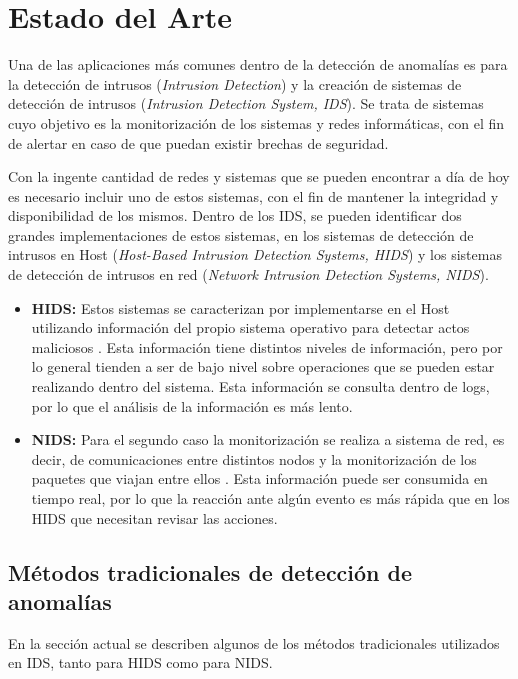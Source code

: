 \chapter{Estado del Arte}
\label{chapter:Estado del Arte}

Una de las aplicaciones más comunes dentro de la detección de anomalías es para la detección de intrusos (\textit{Intrusion Detection}) y la creación de sistemas de detección de intrusos (\textit{Intrusion Detection System, IDS}). Se trata de sistemas cuyo objetivo es la monitorización de los sistemas y redes informáticas, con el fin de alertar en caso de que puedan existir brechas de seguridad\cite{intrusionSystems}. 

Con la ingente cantidad de redes y sistemas que se pueden encontrar a día de hoy es necesario incluir uno de estos sistemas, con el fin de mantener la integridad y disponibilidad de los mismos. Dentro de los IDS, se pueden identificar dos grandes implementaciones de estos sistemas, en los sistemas de detección de intrusos en Host (\textit{Host-Based Intrusion Detection Systems, HIDS}) y los sistemas de detección de intrusos en red (\textit{Network Intrusion Detection Systems, NIDS}).

\begin{itemize}
    \item \textbf{HIDS:} Estos sistemas se caracterizan por implementarse en el Host utilizando información del propio sistema operativo para detectar actos maliciosos \cite{HIDS}. Esta información tiene distintos niveles de información, pero por lo general tienden a ser de bajo nivel sobre operaciones que se pueden estar realizando dentro del sistema. Esta información se consulta dentro de logs, por lo que el análisis de la información es más lento.
   \item \textbf{NIDS:} Para el segundo caso la monitorización se realiza a sistema de red, es decir, de comunicaciones entre distintos nodos y la monitorización de los paquetes que viajan entre ellos \cite{intrusionSystems}. Esta información puede ser consumida en tiempo real, por lo que la reacción ante algún evento es más rápida que en los HIDS que necesitan revisar las acciones.
\end{itemize}

\section{Métodos tradicionales de detección de anomalías}
En la sección actual se describen algunos de los métodos tradicionales utilizados en IDS, tanto para HIDS como para NIDS.

